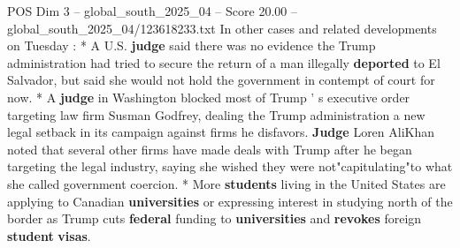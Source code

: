 \begin{textsample}{POS Dim 3 – global\_south\_2025\_04 – Score 20.00 – global\_south\_2025\_04/123618233.txt}
In other cases and related developments on Tuesday : * A U.S. \textbf{judge} said there was no evidence the Trump administration had tried to secure the return of a man illegally \textbf{deported} to El Salvador, but said she would not hold the government in contempt of court for now. * A \textbf{judge} in Washington blocked most of Trump ' s executive order targeting law firm Susman Godfrey, dealing the Trump administration a new legal setback in its campaign against firms he disfavors. \textbf{Judge} Loren AliKhan noted that several other firms have made deals with Trump after he began targeting the legal industry, saying she wished they were not"capitulating"to what she called government coercion. * More \textbf{students} living in the United States are applying to Canadian \textbf{universities} or expressing interest in studying north of the border as Trump cuts \textbf{federal} funding to \textbf{universities} and \textbf{revokes} foreign \textbf{student} \textbf{visas}.

\end{textsample}
